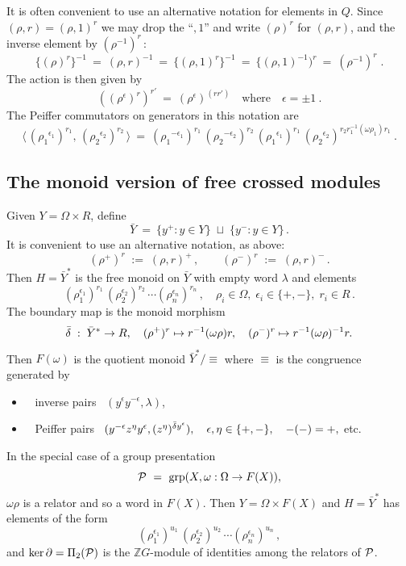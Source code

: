It is often convenient to use an alternative notation for elements in $Q$.
Since  $(\rho,r) = (\rho,1)^r$
we may drop the ``$,1$'' and write  $(\rho)^r$  for  $(\rho,r)$,
and the inverse element by  $(\rho^{-1})^r$\,:
$$
\{(\rho)^r\}^{-1} ~=~
(\rho,r)^{-1} ~=~
\{(\rho,1)^r\}^{-1} ~=~
\{(\rho,1)^{-1})^r ~=~
(\rho^{-1})^r\;.
$$
The action is then given by  
$$
((\rho^{\epsilon})^r)^{r'} ~=~ (\rho^{\epsilon})^{(rr')}
\quad\text{where}\quad \epsilon = \pm 1~.
$$
The Peiffer commutators on generators in this notation are
$$
\langle\,({\rho_1}^{\epsilon_1})^{r_1},\,({\rho_2}^{\epsilon_2})^{r_2}
\,\rangle
~=~
({\rho_1}^{-\epsilon_1})^{r_1}\,({\rho_2}^{-\epsilon_2})^{r_2}\,
({\rho_1}^{\epsilon_1})^{r_1}\,
({\rho_2}^{\epsilon_2})^{r_2 r_1^{-1} (\omega\rho_1) r_1}~.
$$

\bigskip
\subsection{The monoid version of free crossed modules}

Given  $Y = \Omega \times R$, define
$$
\bar{Y} ~=~ \{ y^+ : y \in Y \} \;\sqcup\; \{ y^- : y \in Y \}\,.
$$
It is convenient to use an alternative notation, as above:
$$
(\rho^+)^r \;:=\; (\rho,r)^+\,, \quad\quad
(\rho^-)^r \;:=\; (\rho,r)^-\,.
$$
Then  $H = \bar{Y}^{\ast}$ is the free monoid on $\bar{Y}$
with empty word $\lambda$ and elements
$$
(\rho_1^{\epsilon_1})^{r_1}\, (\rho_2^{\epsilon_2})^{r_2}\, 
\cdots (\rho_n^{\epsilon_n})^{r_n}\,, \quad
\rho_i \in \Omega,\; \epsilon_i \in \{+,-\},\; r_i \in R\,. 
$$
The boundary map is the monoid morphism
$$
\bar{\delta} \;:\; \bar{Y}^{\ast} \to R,\quad
(\rho^+)^r \mapsto r^{-1}(\omega \rho)r,\quad
(\rho^-)^r \mapsto r^{-1}(\omega \rho)^{-1}r.
$$
Then $F(\omega)$ is the quotient monoid  $\bar{Y}^{\ast}/\equiv$
where $\equiv$ is the congruence generated by 
\begin{itemize}
\item~
inverse pairs~ $(y^{\epsilon}y^{-\epsilon},\lambda)$,
\item~
Peiffer pairs~ $(y^{-\epsilon} z^{\eta} y^{\epsilon},
(z^{\eta})^{\bar{\delta} y^{\epsilon}}), 
\quad \epsilon,\eta \in \{+,-\}, 
\quad -(-) = +,$ \quad etc.
\end{itemize}

In the special case of a group presentation
$$
\mathcal{P} ~=~ \mathrm{grp}( X, \omega : \Omega \to F(X)),
$$
$\omega\rho$ is a relator and so a word in $F(X)$.
Then  $Y = \Omega \times F(X)$  and  
$H = \bar{Y}^{\ast}$  has elements of the form
$$
(\rho_1^{\epsilon_1})^{u_1}\, (\rho_2^{\epsilon_2})^{u_2}\, 
\cdots (\rho_n^{\epsilon_n})^{u_n}\,, 
$$
and $\ker\partial = \Pi_2(\mathcal{P})$ is the $\mathbb{Z}G$-module
of identities among the relators of $\mathcal{P}$.

